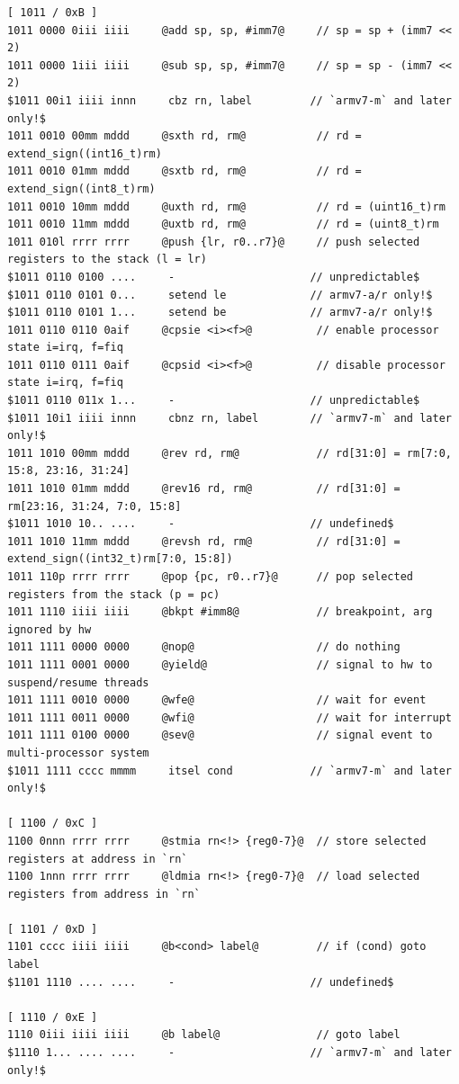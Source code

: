 \documentclass
[
    10pt,
    a4paper,
]
{article}
\begin{document}
\begin{lstlisting}[language=gnu-asm]
[ 1011 / 0xB ]
1011 0000 0iii iiii     @add sp, sp, #imm7@     // sp = sp + (imm7 << 2)
1011 0000 1iii iiii     @sub sp, sp, #imm7@     // sp = sp - (imm7 << 2)
$1011 00i1 iiii innn     cbz rn, label         // `armv7-m` and later only!$
1011 0010 00mm mddd     @sxth rd, rm@           // rd = extend_sign((int16_t)rm)
1011 0010 01mm mddd     @sxtb rd, rm@           // rd = extend_sign((int8_t)rm)
1011 0010 10mm mddd     @uxth rd, rm@           // rd = (uint16_t)rm
1011 0010 11mm mddd     @uxtb rd, rm@           // rd = (uint8_t)rm
1011 010l rrrr rrrr     @push {lr, r0..r7}@     // push selected registers to the stack (l = lr)
$1011 0110 0100 ....     -                     // unpredictable$
$1011 0110 0101 0...     setend le             // armv7-a/r only!$
$1011 0110 0101 1...     setend be             // armv7-a/r only!$
1011 0110 0110 0aif     @cpsie <i><f>@          // enable processor state i=irq, f=fiq
1011 0110 0111 0aif     @cpsid <i><f>@          // disable processor state i=irq, f=fiq
$1011 0110 011x 1...     -                     // unpredictable$
$1011 10i1 iiii innn     cbnz rn, label        // `armv7-m` and later only!$
1011 1010 00mm mddd     @rev rd, rm@            // rd[31:0] = rm[7:0, 15:8, 23:16, 31:24]
1011 1010 01mm mddd     @rev16 rd, rm@          // rd[31:0] = rm[23:16, 31:24, 7:0, 15:8]
$1011 1010 10.. ....     -                     // undefined$
1011 1010 11mm mddd     @revsh rd, rm@          // rd[31:0] = extend_sign((int32_t)rm[7:0, 15:8])
1011 110p rrrr rrrr     @pop {pc, r0..r7}@      // pop selected registers from the stack (p = pc)
1011 1110 iiii iiii     @bkpt #imm8@            // breakpoint, arg ignored by hw
1011 1111 0000 0000     @nop@                   // do nothing
1011 1111 0001 0000     @yield@                 // signal to hw to suspend/resume threads
1011 1111 0010 0000     @wfe@                   // wait for event
1011 1111 0011 0000     @wfi@                   // wait for interrupt
1011 1111 0100 0000     @sev@                   // signal event to multi-processor system
$1011 1111 cccc mmmm     itsel cond            // `armv7-m` and later only!$

[ 1100 / 0xC ]
1100 0nnn rrrr rrrr     @stmia rn<!> {reg0-7}@  // store selected registers at address in `rn`
1100 1nnn rrrr rrrr     @ldmia rn<!> {reg0-7}@  // load selected registers from address in `rn`

[ 1101 / 0xD ]
1101 cccc iiii iiii     @b<cond> label@         // if (cond) goto label
$1101 1110 .... ....     -                     // undefined$

[ 1110 / 0xE ]
1110 0iii iiii iiii     @b label@               // goto label
$1110 1... .... ....     -                     // `armv7-m` and later only!$



\end{lstlisting}
\end{document}
